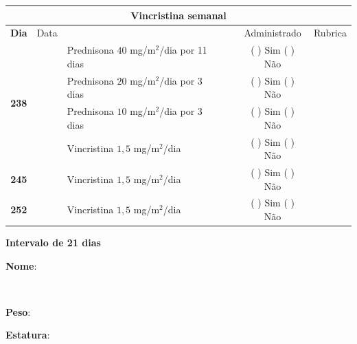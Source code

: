 \documentclass[11pt,a4paper,oldfontcommands]{memoir}
\def\entrywithlabel[#1]#2{\parbox{#1}{{\small #2:} \hrulefill}}
\begin{document}
\begin{center}
\begin{table}[H]
\begin{tabular}{p{1cm}c|p{5cm}|p{1cm}p{2cm}|c|c}
	\hline
	\multicolumn{7}{c}{Vincristina semanal} \\
	\hline
	\multicolumn{1}{c|}{\multirow{1}{*}{\textbf{Dia}}}&{Data}&{}&{}&&{Administrado}&{Rubrica} \\
    \hline
    \multicolumn{1}{c|}{\multirow{4}{*}{\textbf{238}}}&&{Prednisona \(40\) mg/m\(^2\)/dia por 11 dias}&\multicolumn{1}{c}{}&&{(  ) Sim (  ) Não}&\\
    \multicolumn{1}{c|}{}&&{Prednisona \(20\) mg/m\(^2\)/dia por 3 dias}&\multicolumn{1}{c}{}&&{(  ) Sim (  ) Não}&\\
    \multicolumn{1}{c|}{}&&{Prednisona \(10\) mg/m\(^2\)/dia por 3 dias}&\multicolumn{1}{c}{}&&{(  ) Sim (  ) Não}&\\
    \multicolumn{1}{c|}{\textbf{}}&&{Vincristina \(1,5\) mg/m\(^2\)/dia}&\multicolumn{1}{c}{}&&{(  ) Sim (  ) Não}&\\
    \cline{1-6}
    \multicolumn{1}{c|}{\textbf{245}}&&{Vincristina \(1,5\) mg/m\(^2\)/dia}&\multicolumn{1}{c}{}&&{(  ) Sim (  ) Não}&\\
    \cline{1-3}\cline{6-6}
    \multicolumn{1}{c|}{\textbf{252}}&&{Vincristina \(1,5\) mg/m\(^2\)/dia}&\multicolumn{1}{c}{}&&{(  ) Sim (  ) Não}&\\
    \hline
\end{tabular}
\end{table}
\textbf{Intervalo de 21 dias}

\pagebreak
    \noindent
\entrywithlabel[1\hsize]{\textbf{Nome}}\hfill
\\[0.3cm]
\entrywithlabel[.45\hsize]{\textbf{Peso}}\hfill  \entrywithlabel[.45\hsize]{\textbf{Estatura}}


\end{center}
\end{document}

